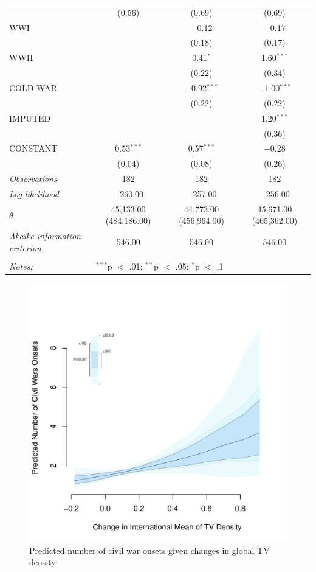 \documentclass[11pt,article,oneside]{memoir}
\makeatletter
\def\maxwidth{\ifdim\Gin@nat@width>\linewidth\linewidth
\else\Gin@nat@width\fi}
\let\Oldincludegraphics\includegraphics
\renewcommand{\includegraphics}[1]{\Oldincludegraphics[width=\maxwidth]{#1}}
\makeatother
\begin{document}
\begin{table}[!htbp]
\begin{tabular}{@{\extracolsep{5pt}}lccc}
  & (0.56) & (0.69) & (0.69) \\ 
  WWI &  & $-$0.12 & $-$0.17 \\ 
  &  & (0.18) & (0.17) \\ 
  WWII &  & 0.41$^{*}$ & 1.60$^{***}$ \\ 
  &  & (0.22) & (0.34) \\ 
  COLD WAR &  & $-$0.92$^{***}$ & $-$1.00$^{***}$ \\ 
  &  & (0.22) & (0.22) \\ 
  IMPUTED &  &  & 1.20$^{***}$ \\ 
  &  &  & (0.36) \\ 
  CONSTANT & 0.53$^{***}$ & 0.57$^{***}$ & $-$0.28 \\ 
  & (0.04) & (0.08) & (0.26) \\ 
 \textit{Observations} & 182 & 182 & 182 \\ 
\textit{Log likelihood} & $-$260.00 & $-$257.00 & $-$256.00 \\ 
$\theta$ & 45,133.00  (484,186.00) & 44,773.00  (456,964.00) & 45,671.00  (465,362.00) \\ 
\textit{Akaike information criterion} & 546.00 & 546.00 & 546.00 \\ 
\hline \\[-1.8ex] 
\textit{Notes:} & \multicolumn{3}{l}{$^{***}$p $<$ .01; $^{**}$p $<$ .05; $^{*}$p $<$ .1} \\ 
\end{tabular} 
\end{table}

\clearpage

\begin{figure} 
\includegraphics{figure/dtv_effect.pdf} 
\caption{Predicted number of civil war onsets given changes in global TV density} 
\label{myFigur} 
\end{figure}
\end{document}
